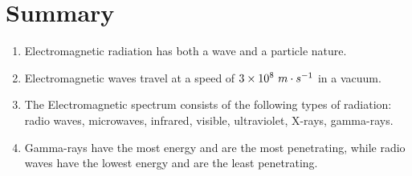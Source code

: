 \section{Summary}
            \nopagebreak
      \label{m38779*id189769}\begin{enumerate}[noitemsep, label=\textbf{\arabic*}. ] 
            \label{m38779*uid30}\item Electromagnetic radiation has both a wave and a particle nature.
\label{m38779*uid31}\item Electromagnetic waves travel at a speed of $3\ensuremath{\times}{10}^{8}\phantom{\rule{3.33333pt}{0ex}}m\ensuremath{\cdot}{s}^{-1}$ in a vacuum.
\label{m38779*uid32}\item The Electromagnetic spectrum consists of the following types of radiation: radio waves, microwaves, infrared, visible, ultraviolet, X-rays, gamma-rays.
\label{m38779*uid33}\item Gamma-rays have the most energy and are the most penetrating, while radio waves have the lowest energy and are the least penetrating.
\end{enumerate}
